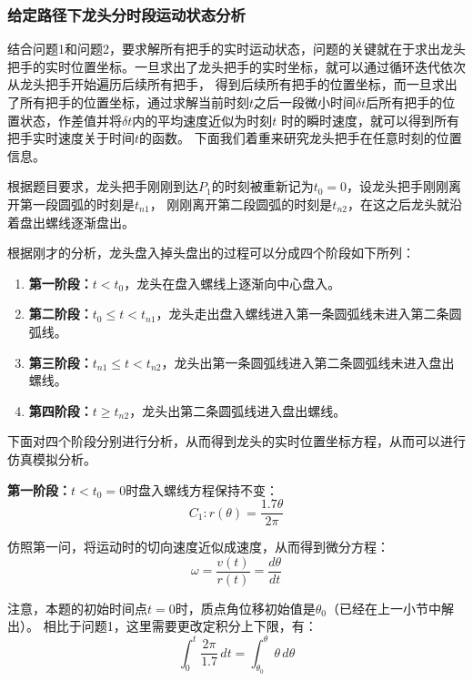 \documentclass{cumcmthesis1}
\begin{document}
\subsubsection{给定路径下龙头分时段运动状态分析}
\par
结合问题1和问题2，要求解所有把手的实时运动状态，问题的关键就在于求出龙头把手的实时位置坐标。一旦求出了龙头把手的实时坐标，就可以通过循环迭代依次从龙头把手开始遍历后续所有把手，
得到后续所有把手的位置坐标，而一旦求出了所有把手的位置坐标，通过求解当前时刻$t$之后一段微小时间$\delta t$后所有把手的位置状态，作差值并将$\delta t$内的平均速度近似为时刻$t$
时的瞬时速度，就可以得到所有把手实时速度关于时间$t$的函数。
下面我们着重来研究龙头把手在任意时刻的位置信息。
\par
根据题目要求，龙头把手刚刚到达$P_1$的时刻被重新记为$t_0=0$，设龙头把手刚刚离开第一段圆弧的时刻是$t_{n1}$，
刚刚离开第二段圆弧的时刻是$t_{n2}$，在这之后龙头就沿着盘出螺线逐渐盘出。
\par
根据刚才的分析，龙头盘入掉头盘出的过程可以分成四个阶段如下所列：
\begin{enumerate}
    \item \textbf{第一阶段：}$t<t_0$，龙头在盘入螺线上逐渐向中心盘入。
    \item \textbf{第二阶段：}$t_0 \leq t<t_{n1}$，龙头走出盘入螺线进入第一条圆弧线未进入第二条圆弧线。
    \item \textbf{第三阶段：}$t_{n1} \leq t< t_{n2}$，龙头出第一条圆弧线进入第二条圆弧线未进入盘出螺线。
    \item \textbf{第四阶段：}$t \geq  t_{n2}$，龙头出第二条圆弧线进入盘出螺线。
\end{enumerate}
\par
下面对四个阶段分别进行分析，从而得到龙头的实时位置坐标方程，从而可以进行仿真模拟分析。
\par
\textbf{第一阶段：}$t<t_0=0$时盘入螺线方程保持不变：
\begin{equation}
    C_1:r(\theta)=\frac{1.7\theta}{2 \pi}
\end{equation}
\par
仿照第一问，将运动时的切向速度近似成速度，从而得到微分方程：
\begin{equation}
    \omega=\frac{v(t)}{r(t)}=\frac{d \theta}{dt}
\end{equation}
\par
注意，本题的初始时间点$t=0$时，质点角位移初始值是$\theta_0$（已经在上一小节中解出）。
相比于问题1，这里需要更改定积分上下限，有：
\begin{equation}
    \int_{0}^{t} \frac{2 \pi}{1.7} \,dt=\int_{\theta_0}^{\theta} \theta \,d \theta  
\end{equation}
\end{document}
